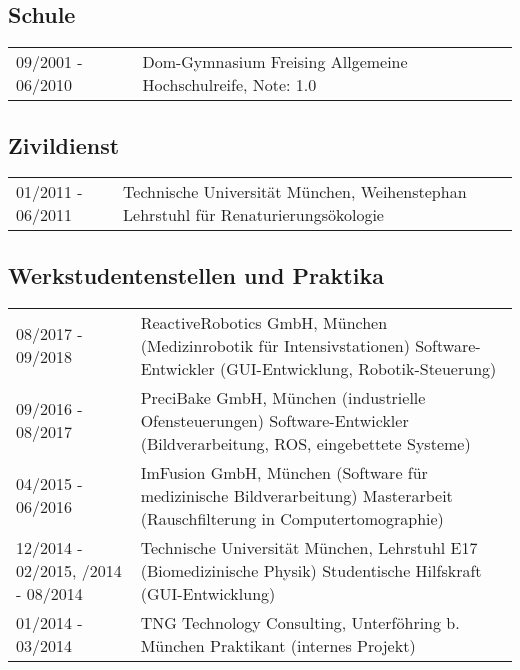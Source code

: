 \documentclass[a4paper,10pt]{memoir}
\begin{document}
\subsection*{Schule}
\vspace*{-\baselineskip}
\begin{longtable}{@{}p{} p{}}
  09/2001 - 06/2010 &
  Dom-Gymnasium Freising  \newline
  Allgemeine Hochschulreife, Note: 1.0
\end{longtable}

\subsection*{Zivildienst}
\vspace*{-\baselineskip}
\begin{longtable}{@{}p{} p{}}
  01/2011 - 06/2011 &
  Technische Universität München, Weihenstephan \newline
  Lehrstuhl für Renaturierungsökologie
\end{longtable}

\subsection*{Werkstudentenstellen und Praktika}
\vspace*{-\baselineskip}
\begin{longtable}{@{}p{} p{}}
  08/2017 - 09/2018 &
  ReactiveRobotics GmbH, München (Medizinrobotik für Intensivstationen) \newline
  Software-Entwickler (GUI-Entwicklung, Robotik-Steuerung)
  \\
  09/2016 - 08/2017 &
  PreciBake GmbH, München (industrielle Ofensteuerungen) \newline
  Software-Entwickler (Bildverarbeitung, ROS, eingebettete Systeme)
  \\
  04/2015 - 06/2016 &
  ImFusion GmbH, München (Software für medizinische Bildverarbeitung) \newline
  Masterarbeit (Rauschfilterung in Computertomographie)
  \\
  12/2014 - 02/2015, \newline
  06/2014 - 08/2014 &
  Technische Universität München, Lehrstuhl E17 (Biomedizinische Physik) \newline
  Studentische Hilfskraft (GUI-Entwicklung)
  \\
  01/2014 - 03/2014 &
  TNG Technology Consulting, Unterföhring b. München \newline
  Praktikant (internes Projekt)
\end{longtable}
\end{document}
